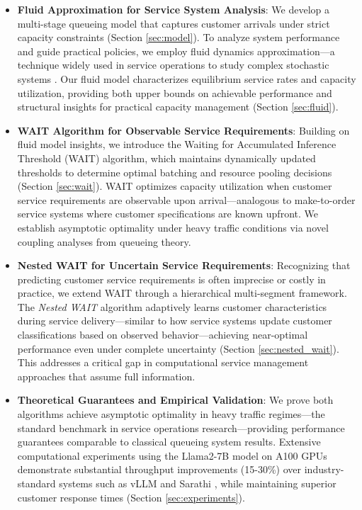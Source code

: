 \documentclass[poms,final,blindrev]{poms1_V1} %
\begin{document}
\begin{itemize}
\item \textbf{Fluid Approximation for Service System Analysis}: We develop a multi-stage queueing model that captures customer arrivals under strict capacity constraints (Section \ref{sec:model}). To analyze system performance and guide practical policies, we employ fluid dynamics approximation—a technique widely used in service operations to study complex stochastic systems \citep{mandelbaum1998strong,maglaras2000discrete,bauerle2002optimal,liu2011network}. Our fluid model characterizes equilibrium service rates and capacity utilization, providing both upper bounds on achievable performance and structural insights for practical capacity management (Section \ref{sec:fluid}).

    \item \textbf{WAIT Algorithm for Observable Service Requirements}: Building on fluid model insights, we introduce the Waiting for Accumulated Inference Threshold (WAIT) algorithm, which maintains dynamically updated thresholds to determine optimal batching and resource pooling decisions (Section \ref{sec:wait}). WAIT optimizes capacity utilization when customer service requirements are observable upon arrival—analogous to make-to-order service systems where customer specifications are known upfront. We establish asymptotic optimality under heavy traffic conditions via novel coupling analyses from queueing theory.

    \item \textbf{Nested WAIT for Uncertain Service Requirements}: Recognizing that predicting customer service requirements is often imprecise or costly in practice, we extend WAIT through a hierarchical multi-segment framework. The \textit{Nested WAIT} algorithm adaptively learns customer characteristics during service delivery—similar to how service systems update customer classifications based on observed behavior—achieving near-optimal performance even under complete uncertainty (Section \ref{sec:nested_wait}). This addresses a critical gap in computational service management approaches that assume full information.
    
    \item \textbf{Theoretical Guarantees and Empirical Validation}: We prove both algorithms achieve asymptotic optimality in heavy traffic regimes—the standard benchmark in service operations research—providing performance guarantees comparable to classical queueing system results. Extensive computational experiments using the Llama2-7B model on A100 GPUs demonstrate substantial throughput improvements (15-30\%) over industry-standard systems such as vLLM \citep{kwon2023efficient} and Sarathi \citep{agrawal2023sarathi}, while maintaining superior customer response times (Section \ref{sec:experiments}).
\end{itemize}
\end{document}

